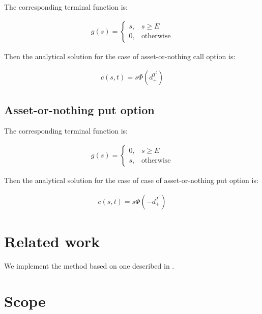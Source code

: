 \documentclass[11pt,a4paper]{extarticle}
\begin{document}
The corresponding terminal function is:

\begin{equation}
    \begin{aligned}
    g(s)=\begin{cases}s,&s\geq E \\ 0,&\text{otherwise}\end{cases}
    \end{aligned}
    \end{equation}

Then the analytical solution for the case of asset-or-nothing call option is:

\begin{equation}
    \begin{aligned}
    c(s,t) = s\Phi(d_{+}^{T^\prime})
    \end{aligned}
    \end{equation}

\subsection{Asset-or-nothing put option}

The corresponding terminal function is:

\begin{equation}
    \begin{aligned}
    g(s)=\begin{cases}0,&s\geq E \\ s,&\text{otherwise}\end{cases}
    \end{aligned}
    \end{equation}

Then the analytical solution for the case of case of asset-or-nothing put option is:

\begin{equation}
    \begin{aligned}
    c(s,t) =s\Phi(-d_{+}^{T^\prime})
    \end{aligned}
    \end{equation}

\section{Related work}

We implement the method based on one described in \cite{oseledets}.

\section{Scope}
\end{document}

